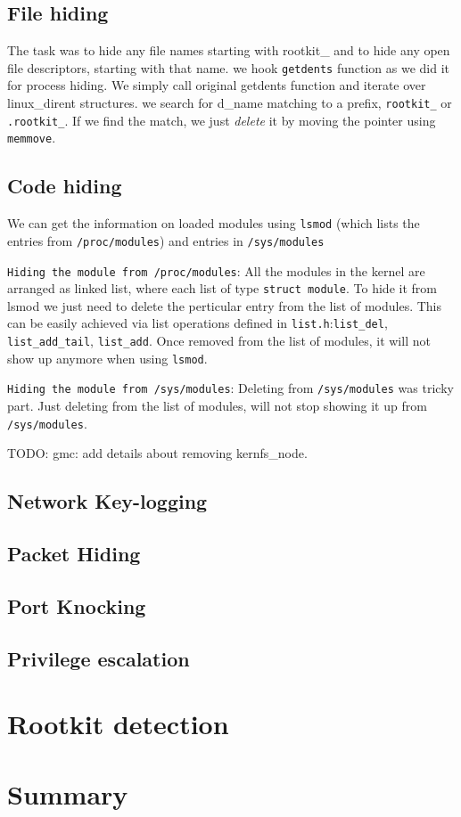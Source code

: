 \documentclass[10pt, letterpaper]{scrartcl}
\begin{document}
\subsection{File hiding}
The task was to hide any file names starting with rootkit\_ and to hide any open file descriptors, starting with that name.
we hook \texttt{getdents} function as we did it for process hiding. 
We simply call original getdents function and iterate over linux\_dirent structures.
we search for d\_name matching to a prefix, \texttt{rootkit\_} or \texttt{.rootkit\_}. 
If we find the match, we just {\em delete} it by moving the pointer using \texttt{memmove}.


\subsection{Code hiding}
We can get the information on loaded modules using \texttt{lsmod}
(which lists the entries from \texttt{/proc/modules}) and entries in \texttt{/sys/modules}

\texttt{Hiding the module from /proc/modules}: All the modules in the kernel are arranged as linked list, 
where each list of type \texttt{struct module}. 
To hide it from lsmod we just need to delete the perticular entry from the list of modules. This can be easily achieved via list operations defined in \texttt{list.h}:\texttt{list\_del}, \texttt{list\_add\_tail}, \texttt{list\_add}. Once removed from the list of modules, it will not show up anymore when using \texttt{lsmod}. 

\texttt{Hiding the module from /sys/modules}: Deleting from \texttt{/sys/modules} was tricky part. Just deleting from the list of modules, 
will not stop showing it up from \texttt{/sys/modules}. 

TODO: gmc: add details about removing kernfs\_node. 

\subsection{Network Key-logging}
\subsection{Packet Hiding}
\subsection{Port Knocking}
\subsection{Privilege escalation}

\section{Rootkit detection}

\section{Summary}
\end{document}
